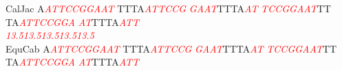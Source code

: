 \documentclass[11pt,twoside,reqno,a4paper]{article}
\begin{document}
{CalJac	A\textit{\textcolor{red}{A}}\textit{\textcolor{red}{T}}\textit{\textcolor{red}{T}}\textit{\textcolor{red}{C}}\textit{\textcolor{red}{C}}\textit{\textcolor{red}{G}}\textit{\textcolor{red}{G}}\textit{\textcolor{red}{A}}\textit{\textcolor{red}{A}}\textit{\textcolor{red}{T}}	TTTA\textit{\textcolor{red}{A}}\textit{\textcolor{red}{T}}\textit{\textcolor{red}{T}}\textit{\textcolor{red}{C}}\textit{\textcolor{red}{C}}\textit{\textcolor{red}{G}}	\textit{\textcolor{red}{G}}\textit{\textcolor{red}{A}}\textit{\textcolor{red}{A}}\textit{\textcolor{red}{T}}TTTA\textit{\textcolor{red}{A}}\textit{\textcolor{red}{T}}	\textit{\textcolor{red}{T}}\textit{\textcolor{red}{C}}\textit{\textcolor{red}{C}}\textit{\textcolor{red}{G}}\textit{\textcolor{red}{G}}\textit{\textcolor{red}{A}}\textit{\textcolor{red}{A}}\textit{\textcolor{red}{T}}TT	TA\textit{\textcolor{red}{A}}\textit{\textcolor{red}{T}}\textit{\textcolor{red}{T}}\textit{\textcolor{red}{C}}\textit{\textcolor{red}{C}}\textit{\textcolor{red}{G}}\textit{\textcolor{red}{G}}\textit{\textcolor{red}{A}}	\textit{\textcolor{red}{A}}\textit{\textcolor{red}{T}}TTTA\textit{\textcolor{red}{A}}\textit{\textcolor{red}{T}}\textit{\textcolor{red}{T}}\\
\hspace*{7\charwidth}\hspace*{1\charwidth}\textit{\textcolor{red}{13.5}}\hspace*{1\charwidth}\hspace*{10\charwidth}\textit{\textcolor{red}{13.5}}\hspace*{1\charwidth}\hspace*{10\charwidth}\textit{\textcolor{red}{13.5}}\hspace*{1\charwidth}\hspace*{1\charwidth}\hspace*{10\charwidth}\textit{\textcolor{red}{13.5}}\hspace*{1\charwidth}\hspace*{10\charwidth}\textit{\textcolor{red}{13.5}}\hspace*{1\charwidth}\\
EquCab	A\textit{\textcolor{red}{A}}\textit{\textcolor{red}{T}}\textit{\textcolor{red}{T}}\textit{\textcolor{red}{C}}\textit{\textcolor{red}{C}}\textit{\textcolor{red}{G}}\textit{\textcolor{red}{G}}\textit{\textcolor{red}{A}}\textit{\textcolor{red}{A}}\textit{\textcolor{red}{T}}	TTTA\textit{\textcolor{red}{A}}\textit{\textcolor{red}{T}}\textit{\textcolor{red}{T}}\textit{\textcolor{red}{C}}\textit{\textcolor{red}{C}}\textit{\textcolor{red}{G}}	\textit{\textcolor{red}{G}}\textit{\textcolor{red}{A}}\textit{\textcolor{red}{A}}\textit{\textcolor{red}{T}}TTTA\textit{\textcolor{red}{A}}\textit{\textcolor{red}{T}}	\textit{\textcolor{red}{T}}\textit{\textcolor{red}{C}}\textit{\textcolor{red}{C}}\textit{\textcolor{red}{G}}\textit{\textcolor{red}{G}}\textit{\textcolor{red}{A}}\textit{\textcolor{red}{A}}\textit{\textcolor{red}{T}}TT	TA\textit{\textcolor{red}{A}}\textit{\textcolor{red}{T}}\textit{\textcolor{red}{T}}\textit{\textcolor{red}{C}}\textit{\textcolor{red}{C}}\textit{\textcolor{red}{G}}\textit{\textcolor{red}{G}}\textit{\textcolor{red}{A}}	\textit{\textcolor{red}{A}}\textit{\textcolor{red}{T}}TTTA\textit{\textcolor{red}{A}}\textit{\textcolor{red}{T}}\textit{\textcolor{red}{T}}\\
}
\end{document}
